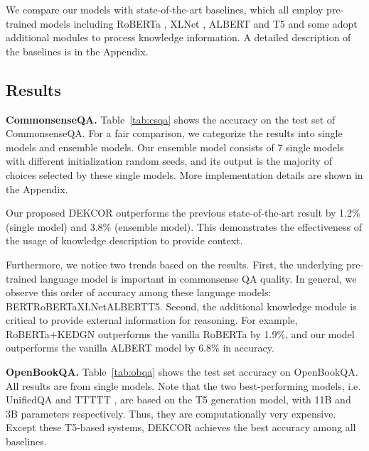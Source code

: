 \documentclass[11pt,a4paper]{article}
\begin{document}
We compare our models with state-of-the-art baselines, which all employ pre-trained models including RoBERTa \cite{roberta}, XLNet \cite{xlnet}, ALBERT \cite{ALBERT} and T5 \cite{t5} and some adopt additional modules to process knowledge information. A detailed description of the baselines is in the Appendix.



\subsection{Results}
\textbf{CommonsenseQA.} Table~\ref{tab:csqa} shows the accuracy on the test set of CommonsenseQA. For a fair comparison, we categorize the results into single models and ensemble models. Our ensemble model consists of 7 single models with different initialization random seeds, and its output is the majority of choices selected by these single models. More implementation details are shown in the Appendix.

Our proposed DEKCOR outperforms the previous state-of-the-art result by 1.2\% (single model) and 3.8\% (ensemble model). This demonstrates the effectiveness of the usage of knowledge description to provide context.

Furthermore, we notice two trends based on the results. First, the underlying pre-trained language model is important in commonsense QA quality. In general, we observe this order of accuracy among these language models: BERTRoBERTaXLNetALBERTT5. Second, the additional knowledge module is critical to provide external information for reasoning. For example, RoBERTa+KEDGN outperforms the vanilla RoBERTa by 1.9\%, and our model outperforms the vanilla ALBERT model by 6.8\% in accuracy.

\noindent\textbf{OpenBookQA.} Table~\ref{tab:obqa} shows the test set accuracy on OpenBookQA. All results are from single models. Note that the two best-performing models, i.e. UnifiedQA \citep{unifiedqa} and TTTTT \citep{t5}, are based on the T5 generation model, with 11B and 3B parameters respectively. Thus, they are computationally very expensive. Except these T5-based systems, DEKCOR achieves the best accuracy among all baselines.
\end{document}
